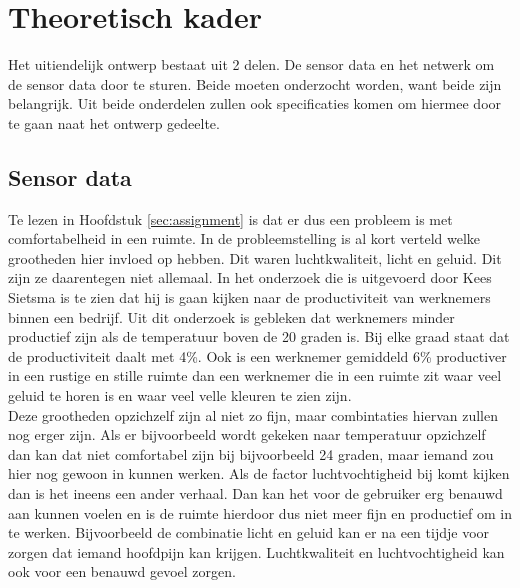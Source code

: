 
\section{Theoretisch kader} \label{sec:theory}

Het uitiendelijk ontwerp bestaat uit 2 delen. De sensor data en het netwerk om de sensor data door te sturen. Beide moeten onderzocht worden, want beide zijn belangrijk.
Uit beide onderdelen zullen ook specificaties komen om hiermee door te gaan naat het ontwerp gedeelte.

\subsection{Sensor data}
Te lezen in Hoofdstuk \ref{sec:assignment} is dat er dus een probleem is met comfortabelheid in een ruimte. In de probleemstelling is al 
kort verteld welke grootheden hier invloed op hebben. Dit waren luchtkwaliteit, licht en geluid. Dit zijn ze daarentegen niet allemaal. 
In het onderzoek die is uitgevoerd door Kees Sietsma \cite{productiviteit} is te zien dat hij is gaan kijken naar de 
productiviteit van werknemers binnen een bedrijf. Uit dit onderzoek is gebleken dat werknemers minder productief zijn als de temperatuur
boven de 20 graden is. Bij elke graad staat dat de productiviteit daalt met 4\%. Ook is een werknemer gemiddeld 6\% productiver in een rustige
en stille ruimte dan een werknemer die in een ruimte zit waar veel geluid te horen is en waar veel velle kleuren te zien zijn. \\

Deze grootheden opzichzelf zijn al niet zo fijn, maar combintaties hiervan zullen nog erger zijn. Als er bijvoorbeeld wordt gekeken naar
temperatuur opzichzelf dan kan dat niet comfortabel zijn bij bijvoorbeeld 24 graden, maar iemand zou hier nog gewoon in kunnen werken. 
Als de factor luchtvochtigheid bij komt kijken dan is het ineens een ander verhaal. Dan kan het voor de gebruiker erg benauwd aan kunnen
voelen en is de ruimte hierdoor dus niet meer fijn en productief om in te werken. Bijvoorbeeld de combinatie licht en geluid kan er na 
een tijdje voor zorgen dat iemand hoofdpijn kan krijgen. Luchtkwaliteit en luchtvochtigheid kan ook voor een benauwd gevoel zorgen. \\

